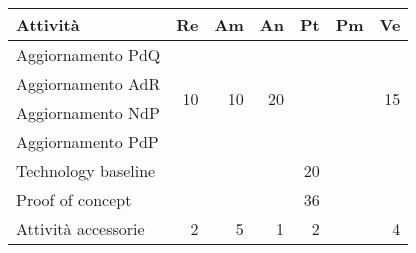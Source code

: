 \begin{table}[H]
	\centering
	\begin{tabular}{|l|r|r|r|r|r|r|}
		\hline
		\rowcolor{lighter-grayer}
		\textbf{Attività}                                                           & \multicolumn{1}{l|}{\textbf{Re}} & \multicolumn{1}{l|}{\textbf{Am}} & \multicolumn{1}{l|}{\textbf{An}} & \multicolumn{1}{l|}{\textbf{Pt}} & \multicolumn{1}{l|}{\textbf{Pm}} & \multicolumn{1}{l|}{\textbf{Ve}} \\ \hline
		Aggiornamento PdQ                                                           & \multirow{4}{*}{10}              & \multirow{4}{*}{10}              & \multirow{4}{*}{20}              & \multirow{4}{*}{ }               & \multirow{4}{*}{
		 }               & \multirow{4}{*}{15}              \\ \cline{1-1}
		Aggiornamento AdR                                                           &                                  &                                  &                                  &                                  &                                  &                                  \\ \cline{1-1}
		Aggiornamento NdP                                                           &                                  &                                  &                                  &                                  &                                  &                                  \\ \cline{1-1}
		Aggiornamento PdP                                                           &                                  &                                  &                                  &                                  &                                  &                                  \\ \hline
		Technology baseline                                                         &                                  &                                  &                                  & 20                               &                                  &                                  \\ \hline
		Proof of concept                                                            &                                 &                                 &                                 & 36                               &                                 &                                 \\ \hline
		Attività accessorie & 2                                & 5                                & 1                                & 2                                &                                  & 4                                \\ \hline

\end{tabular}
\end{table}
